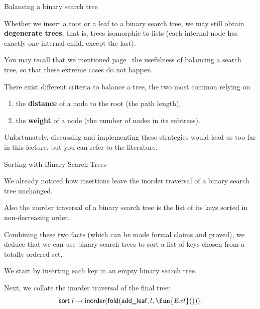 %
\begin{frame}{Balancing a binary search tree}

  Whether we insert a root or a leaf to a binary search tree, we may
  still obtain \textbf{degenerate trees}, that is, trees isomorphic to
  lists (each internal node has exactly one internal child, except the
  last).

  \bigskip

  You may recall that we mentioned page~\pageref{frame:balanced} the
  usefulness of balancing a search tree, so that these extreme cases
  do not happen.

  \bigskip

  There exist different criteria to balance a tree, the two most
  common relying on
  \begin{enumerate}

    \item the \textbf{distance} of a node to the root (the path
      length),

    \item the \textbf{weight} of a node (the number of nodes in its
      subtrees).

  \end{enumerate}

  Unfortunately, discussing and implementing these strategies would
  lead us too far in this lecture, but you can refer to the
  literature.

\end{frame}

%
\begin{frame}{Sorting with Binary Search Trees}

  We already noticed how insertions leave the inorder traversal of a
  binary search tree unchanged.

  \bigskip

  Also the inorder traversal of a binary search tree is the list of
  its keys sorted in non\hyp{}decreasing order.

  \bigskip

  Combining these two facts (which can be made formal claims and
  proved), we deduce that we can use binary search trees to sort a
  list of keys chosen from a totally ordered set.

  \bigskip

  We start by inserting each key in an empty binary search tree.

  \bigskip

  Next, we collate the inorder traversal of the final tree:
  \begin{equation*}
    \ident{sort}\; l \rightarrow \ident{inorder} (\ident{fold}(\ident{add\_leaf}, l, \fun{Ext}())).
  \end{equation*}

\end{frame}
